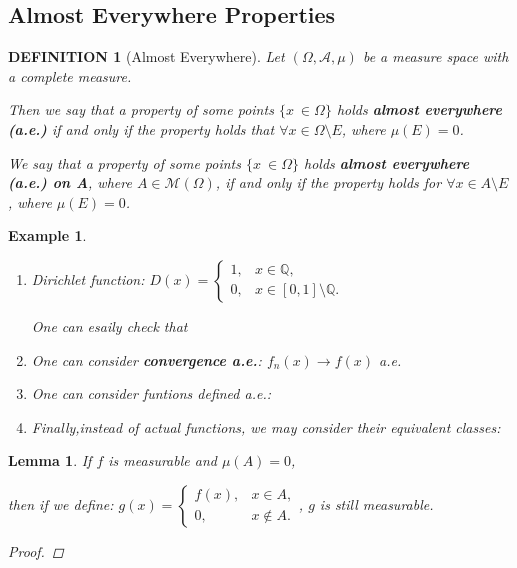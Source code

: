 \documentclass[12pt]{article}
\theoremstyle{blueplain}
\newtheorem{lemma}[theorem]{Lemma}
\theoremstyle{bluedef}
\newtheorem{definition}{DEFINITION}[section]
\theoremstyle{blueremark}
\newtheorem{example}{Example}[section]
\newcommand{\Q}{\mathbb{Q}}
\numberwithin{equation}{section}
\begin{document}








\clearpage

\subsection{Almost Everywhere Properties}

\begin{definition}[Almost Everywhere]

  Let $(\Omega, \mathcal{A}, \mu)$ be a measure space with a complete measure.

  Then we say that a property of some points $\{x\ \in \Omega\}$ holds \textbf{almost everywhere (a.e.)} if and only if the property holds that $\forall x \in \Omega \setminus E$, where $\mu(E) = 0$.

  We say that a property of some points $\{x\ \in \Omega\}$ holds \textbf{almost everywhere (a.e.) on A}, where $A \in \mathcal{M}(\Omega)$, if and only if the property holds for $\forall x \in A \setminus E$, where $\mu(E) = 0$.
\end{definition}

\begin{example}
  \begin{enumerate}
    \item Dirichlet function: $D(x) = \begin{cases} 1, & x \in \Q, \\ 0, & x \in [0,1] \setminus \Q. \end{cases}$

          One can esaily check that
    \item One can consider \textbf{convergence a.e.}: $f_n(x) \rightarrow f(x)$ a.e.

    \item One can consider funtions defined a.e.:

    \item Finally,instead of actual functions, we may consider their equivalent classes:

  \end{enumerate}
\end{example}

\begin{lemma}
  If $f$ is measurable and $\mu(A) = 0$,

  then if we define:
  $g(x) = \begin{cases} f(x), & x \in A, \\ 0,  & x \notin A.\end{cases}$, $g$ is still measurable.
  \begin{proof}

  \end{proof}
\end{lemma}
\end{document}

